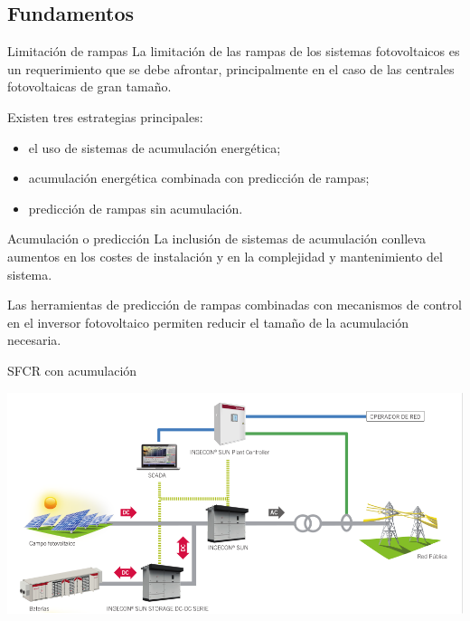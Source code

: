 \documentclass[aspectratio=169, usenames,svgnames,dvipsnames]{beamer}
\begin{document}
\subsection{Fundamentos}
\label{sec:orga6a3e28}
\begin{frame}[label={sec:orge872e02}]{Limitación de rampas}
La limitación de las rampas de los sistemas fotovoltaicos es un
requerimiento que se debe afrontar, principalmente en el caso de las
centrales fotovoltaicas de gran tamaño.

Existen \alert{tres estrategias} principales:
\begin{itemize}
\item el uso de \alert{sistemas de acumulación} energética;
\item \alert{acumulación} energética combinada \alert{con predicción} de rampas;
\item \alert{predicción} de rampas \alert{sin acumulación}.
\end{itemize}
\end{frame}

\begin{frame}[label={sec:orgfc4297e}]{Acumulación o predicción}
La inclusión de sistemas de acumulación conlleva \alert{aumentos en los
costes} de instalación y en la \alert{complejidad y mantenimiento} del
sistema.

Las herramientas de \alert{predicción} de rampas combinadas con \alert{mecanismos de
control en el inversor} fotovoltaico permiten \alert{reducir} el tamaño de la
acumulación necesaria.
\end{frame}

\begin{frame}[label={sec:orgcfcb58a}]{SFCR con acumulación}
\begin{center}
\includegraphics[width=\textwidth]{../figs/EsquemaSFCRAcumulacion.pdf}
\end{center}
\end{frame}
\end{document}
